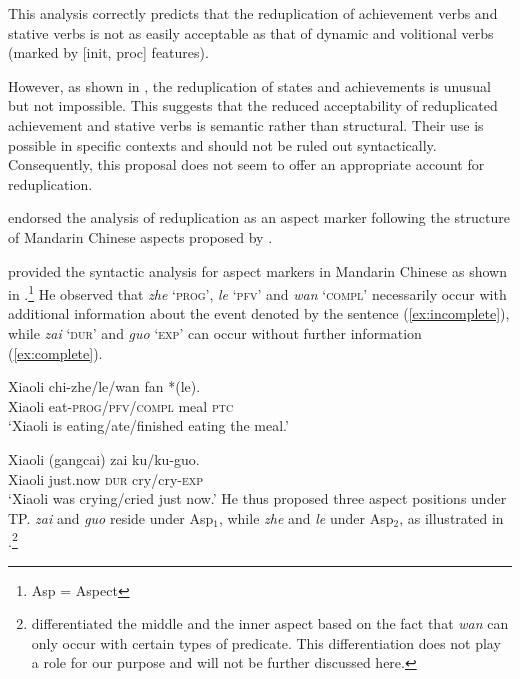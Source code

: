 This analysis correctly predicts that the reduplication of achievement verbs and stative verbs is not as easily acceptable as that of dynamic and volitional verbs (marked by [init, proc] features).

However, as shown in , the reduplication of states and achievements is unusual but not impossible.
This suggests that the reduced acceptability of reduplicated achievement and stative verbs is semantic rather than structural. 
Their use is possible in specific contexts and should not be ruled out syntactically.
Consequently, this proposal does not seem to offer an appropriate account for  reduplication.
 
 
 
 
 
 \citet{YangWei2017} endorsed the analysis of  reduplication as an aspect marker following the structure of Mandarin Chinese aspects proposed by \citet{Tsai2008}.
 
\citet{Tsai2008} provided the syntactic analysis for aspect markers in Mandarin Chinese as shown in .\footnote{Asp = Aspect}
He observed that  \textit{zhe} `\textsc{prog}', \textit{le} `\textsc{pfv}' and \textit{wan} `\textsc{compl}' necessarily occur with additional information about the event denoted by the sentence (\ref{ex:incomplete}), 
while \textit{zai} `\textsc{dur}' and \textit{guo} `\textsc{exp}' can occur without further information (\ref{ex:complete}).
 
\ea\label{ex:incomplete}
 \gll Xiaoli chi-zhe/le/wan fan *(le).\\
 Xiaoli eat-\textsc{prog}/\textsc{pfv}/\textsc{compl} meal \textsc{ptc}\\
 \glt `Xiaoli is eating/ate/finished eating the meal.'
\z

\ea\label{ex:complete}
\gll Xiaoli (gangcai) zai ku/ku-guo.\\
Xiaoli just.now \textsc{dur} cry/cry-\textsc{exp}\\
\glt `Xiaoli was crying/cried just now.'
\z
He thus proposed three aspect positions under TP. \textit{zai} and \textit{guo} reside under Asp$_1$, while \textit{zhe} and \textit{le} under Asp$_2$, as illustrated in .\footnote{\citet{Tsai2008} differentiated the middle and the inner aspect based on the fact that \textit{wan} can only occur with certain types of predicate. This differentiation does not play a role for our purpose and will not be further discussed here.}

